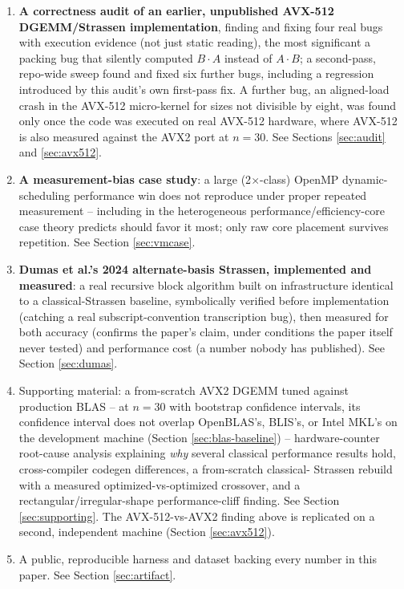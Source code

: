 \documentclass[acmsmall]{acmart}
\begin{document}
\begin{enumerate}
  \item \textbf{A correctness audit of an earlier, unpublished AVX-512
    DGEMM/Strassen implementation}, finding and fixing four real bugs
    with execution evidence (not just static reading), the most
    significant a packing bug that silently computed $B \cdot A$
    instead of $A \cdot B$; a second-pass, repo-wide sweep found and
    fixed six further bugs, including a regression introduced by this
    audit's own first-pass fix. A further bug, an aligned-load crash
    in the AVX-512 micro-kernel for sizes not divisible by eight, was
    found only once the code was executed on real AVX-512 hardware, where
    AVX-512 is also measured against the AVX2 port at $n{=}30$. See
    Sections \ref{sec:audit} and \ref{sec:avx512}.
  \item \textbf{A measurement-bias case study}: a large (2$\times$-class)
    OpenMP dynamic-scheduling performance win does not reproduce under
    proper repeated measurement -- including in the heterogeneous
    performance/efficiency-core case theory predicts should favor it
    most; only raw core placement survives repetition. See Section
    \ref{sec:vmcase}.
  \item \textbf{Dumas et al.'s 2024 alternate-basis Strassen,
    implemented and measured}: a real recursive block algorithm built
    on infrastructure identical to a classical-Strassen baseline,
    symbolically verified before implementation (catching a real
    subscript-convention transcription bug), then measured for both
    accuracy (confirms the paper's claim, under conditions the paper
    itself never tested) and performance cost (a number nobody has
    published). See Section \ref{sec:dumas}.
  \item Supporting material: a from-scratch AVX2 DGEMM tuned against
    production BLAS -- at $n{=}30$ with bootstrap confidence intervals,
    its confidence interval does not overlap OpenBLAS's, BLIS's, or
    Intel MKL's on the development machine (Section
    \ref{sec:blas-baseline}) -- hardware-counter root-cause analysis
    explaining \emph{why} several classical performance results hold,
    cross-compiler codegen differences, a from-scratch classical-
    Strassen rebuild with a measured optimized-vs-optimized crossover,
    and a rectangular/irregular-shape performance-cliff finding. See
    Section \ref{sec:supporting}. The AVX-512-vs-AVX2 finding above is
    replicated on a second, independent machine (Section
    \ref{sec:avx512}).
  \item A public, reproducible harness and dataset backing every number
    in this paper. See Section \ref{sec:artifact}.
\end{enumerate}
\end{document}
